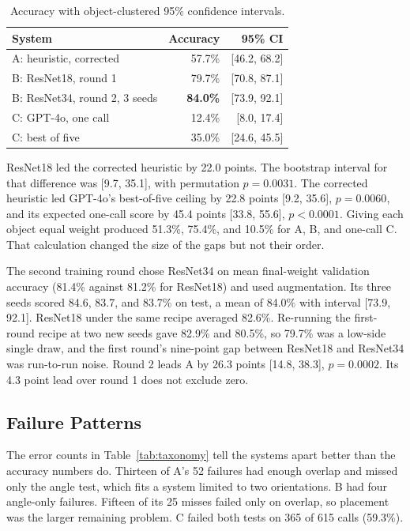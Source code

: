 \documentclass[10pt,conference,compsoc]{IEEEtran}
\begin{document}
\begin{table}[t]
\caption{Accuracy with object-clustered 95\% confidence intervals.}
\label{tab:accuracy}
\centering
\begin{tabular}{lrr}
\toprule
System & Accuracy & 95\% CI \\
\midrule
A: heuristic, corrected & 57.7\% & [46.2, 68.2] \\
B: ResNet18, round 1 & 79.7\% & [70.8, 87.1] \\
B: ResNet34, round 2, 3 seeds & \textbf{84.0\%} & [73.9, 92.1] \\
C: GPT-4o, one call & 12.4\% & [8.0, 17.4] \\
C: best of five & 35.0\% & [24.6, 45.5] \\
\bottomrule
\end{tabular}
\end{table}

ResNet18 led the corrected heuristic by 22.0 points. The bootstrap interval
for that difference was [9.7, 35.1], with permutation $p=0.0031$. The
corrected heuristic led GPT-4o's best-of-five ceiling by 22.8 points [9.2,
35.6], $p=0.0060$, and its expected one-call score by 45.4 points [33.8,
55.6], $p<0.0001$. Giving each object equal weight produced 51.3\%, 75.4\%,
and 10.5\% for A, B, and one-call C. That calculation changed the size of the
gaps but not their order.

The second training round chose ResNet34 on mean final-weight validation
accuracy (81.4\% against 81.2\% for ResNet18) and used augmentation. Its
three seeds scored 84.6, 83.7, and 83.7\% on test, a mean of 84.0\% with
interval [73.9, 92.1]. ResNet18 under the same recipe averaged 82.6\%.
Re-running the first-round recipe at two new seeds gave 82.9\% and 80.5\%,
so 79.7\% was a low-side single draw, and the first round's nine-point gap
between ResNet18 and ResNet34 was run-to-run noise. Round 2 leads A by 26.3
points [14.8, 38.3], $p=0.0002$. Its 4.3 point lead over round 1 does not
exclude zero.

\subsection{Failure Patterns}

The error counts in Table~\ref{tab:taxonomy} tell the systems apart better
than the accuracy numbers do. Thirteen of A's 52 failures had enough overlap and missed
only the angle test, which fits a system limited to two orientations. B had
four angle-only failures. Fifteen of its 25 misses failed only on overlap, so
placement was the larger remaining problem. C failed both tests on 365 of 615
calls (59.3\%).
\end{document}
